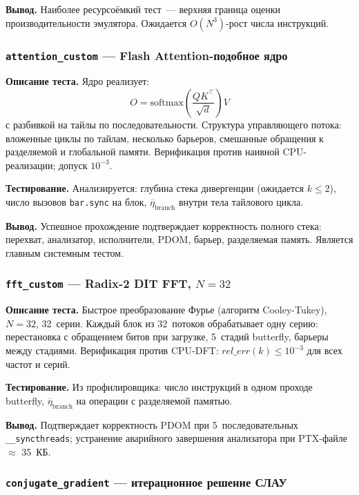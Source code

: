 \textbf{Вывод.}
Наиболее ресурсоёмкий тест~--- верхняя граница оценки
производительности эмулятора. Ожидается $O(N^3)$-рост числа инструкций.

\subsubsection{\texttt{attention\_custom} --- Flash Attention-подобное ядро}

\textbf{Описание теста.}
Ядро реализует:
\[
  O = \mathrm{softmax}\!\left(\frac{Q K^\top}{\sqrt{d}}\right) V
\]
с разбивкой на тайлы по последовательности. Структура управляющего
потока: вложенные циклы по тайлам, несколько барьеров, смешанные
обращения к разделяемой и глобальной памяти.
Верификация против наивной CPU-реализации; допуск $10^{-3}$.

\textbf{Тестирование.}
Анализируется: глубина стека дивергенции (ожидается $k \leq 2$),
число вызовов \texttt{bar.sync} на блок,
$\overline{\eta}_{\mathrm{branch}}$ внутри тела тайлового цикла.

\textbf{Вывод.}
Успешное прохождение подтверждает корректность полного стека:
перехват, анализатор, исполнители, PDOM, барьер, разделяемая память.
Является главным системным тестом.

\subsubsection{\texttt{fft\_custom} --- Radix-2 DIT FFT, $N=32$}

\textbf{Описание теста.}
Быстрое преобразование Фурье (алгоритм Cooley-Tukey), $N=32$,
32~серии. Каждый блок из 32~потоков обрабатывает одну серию:
перестановка с обращением битов при загрузке, 5~стадий butterfly,
барьеры между стадиями.
Верификация против CPU-DFT:
$\mathit{rel\_err}(k) \leq 10^{-3}$ для всех частот и серий.

\textbf{Тестирование.}
Из профилировщика: число инструкций в одном проходе butterfly,
$\overline{\eta}_{\mathrm{branch}}$ на операции с разделяемой памятью.

\textbf{Вывод.}
Подтверждает корректность PDOM при 5~последовательных
\texttt{\_\_syncthreads}; устранение аварийного завершения анализатора
при PTX-файле $\approx$ 35~КБ.

\subsubsection{\texttt{conjugate\_gradient} --- итерационное решение СЛАУ}

